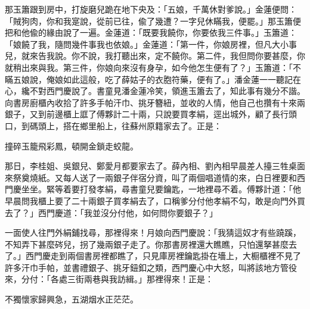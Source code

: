 那玉簫跟到房中，打旋磨兒跪在地下央及：「五娘，千萬休對爹說。」金蓮便問：「賊狗肉，你和我寔說，從前已往，偸了幾遭？一字兒休瞞我，便罷。」那玉簫便把和他偸的緣由說了一遍。金蓮道：「既要我饒你，你要依我三件事。」玉簫道：「娘饒了我，隨問幾件事我也依娘。」金蓮道：「第一件，你娘房裡，但凡大小事兒，就來告我說。你不說，我打聽出來，定不饒你。第二件，我但問你要甚麼，你就稍出來與我。第三件，你娘向來沒有身孕，如今他怎生便有了？」{}玉簫道：「不瞞五娘說，俺娘如此這般，吃了薛姑子的衣胞符藥，便有了。」潘金蓮一一聽記在心，纔不對西門慶說了。書童見潘金蓮冷笑，領進玉簫去了，知此事有幾分不諧。向書房廚櫃內收拾了許多手帕汗巾、挑牙簪紐，並收的人情，他自己也攢有十來兩銀子，又到前邊櫃上誆了傅夥計二十兩，只說要買孝絹，逕出城外，顧了長行頭口，到碼頭上，搭在鄉里船上，往蘇州原籍家去了。{}正是：

\begin{myquote} 
撞碎玉籠飛彩鳳，頓開金鎖走蛟龍。
\end{myquote} 

那日，李桂姐、吳銀兒、鄭愛月都要家去了。薛內相、劉內相早晨差人擡三牲桌面來祭奠燒紙。又每人送了一兩銀子伴宿分資，叫了兩個唱道情的來，白日裡要和西門慶坐坐。緊等着要打發孝絹，尋書童兒要鑰匙，一地裡尋不着。傅夥計道：「他早晨問我櫃上要了二十兩銀子買孝絹去了，口稱爹分付他孝絹不勾，敢是向門外買去了？」西門慶道：「我並沒分付他，如何問你要銀子？」

一面使人往門外絹鋪找尋，那裡得來！月娘向西門慶說：「我猜這奴才有些蹺蹊，不知弄下甚麼硶兒，{}拐了幾兩銀子走了。你那書房裡還大瞧瞧，只怕還拏甚麼去了。」西門慶走到兩個書房裡都瞧了，只見庫房裡鑰匙掛在墻上，大橱櫃裡不見了許多汗巾手帕，並書禮銀子、挑牙鈕釦之類，西門慶心中大怒，叫將該地方管役來，分付：「各處三街兩巷與我訪緝。」那裡得來！正是：

\begin{myquote} 
不獨懷家歸興急，五湖烟水正茫茫。
\end{myquote} 

